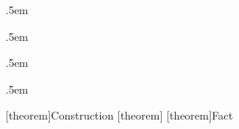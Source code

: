 \ifnum{}
	\ifnum{}
		\let\oldproof\proof
		\renewenvironment{proof}%
		{\begin{oldproof}}%
		{\qed\end{oldproof}}
	\fi
\fi

%
\ifnum{}				%
  {\topsep} %
  {\topsep} %
  {\itshape} %
  {} %
  {\bfseries} %
  {} %
  {.5em} %
  {} %

  {\topsep} %
  {\topsep} %
  {\itshape} %
  {} %
  {\bfseries} %
  {} %
  {.5em} %
  {} %

  {} %
  {} %
  {} %
  {} %
  {\bfseries} %
  {} %
  {.5em} %
  {} %

  {} %
  {} %
  {} %
  {} %
  {\itshape} %
  {} %
  {.5em} %
  {} %

	\theoremstyle{mytheorem}				%
	\newtheorem{theorem}{Theorem}[section]

	\theoremstyle{myplain}
	\newtheorem{lemma}[theorem]{Lemma}
	\newtheorem{corollary}[theorem]{Corollary}
	\newtheorem{proposition}[theorem]{Proposition}
	\newtheorem{construction}[theorem]{Construction}
	\newtheorem{conjecture}[theorem]{Conjecture}

	\theoremstyle{mydefinition}
	\newtheorem{definition}[theorem]{Definition}
	\newtheorem{claim}[theorem]{Claim}
	\newtheorem{assumption}[theorem]{Assumption}
	\newtheorem{fact}[theorem]{Fact}

	\theoremstyle{myremark}
	\newtheorem{remark}[theorem]{Remark}
	\newtheorem{note}[theorem]{Note}
	\newtheorem{observation}[theorem]{Observation}
\else									%
	[theorem]{Construction}{\bfseries}{}
	[theorem]{}{\bfseries}{}
	[theorem]{Fact}{\bfseries}{}

